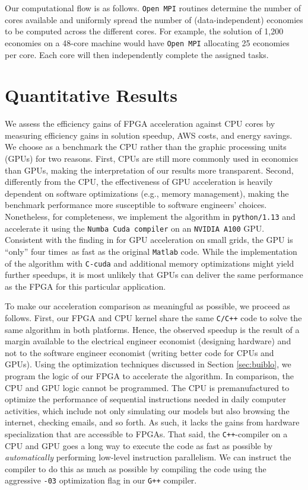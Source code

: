 \documentclass[12pt,american]{article}
\makeatletter
\newcommand{\numbeconII}{1,200\@\xspace}
\newcommand{\speedGPUvsMatlab}{four times}
\makeatother
\begin{document}
Our computational flow is as follows. \texttt{Open MPI} routines determine the number of cores available and uniformly spread the number of (data-independent) economies to be computed across the different cores. For example, the solution of \numbeconII economies on a 48-core machine would have \texttt{Open MPI} allocating 25 economies per core. Each core will then independently complete the assigned tasks. 

\section{Quantitative Results}\label{sec:quantitative}

We assess the efficiency gains of FPGA acceleration against CPU cores by measuring efficiency gains in solution speedup, AWS costs, and energy savings. We choose as a benchmark the CPU rather than the graphic processing units (GPUs) for two reasons. First, CPUs are still more commonly used in economics than GPUs, making the interpretation of our results more transparent. Second, differently from the CPU, the effectiveness of GPU acceleration is heavily dependent on software optimizations (e.g., memory management), making the benchmark performance more susceptible to software engineers' choices. Nonetheless, for completeness, we implement the \cite{MaliarMaliarValli2010} algorithm in \texttt{python/1.13} and accelerate it using the \texttt{Numba Cuda compiler} on an \texttt{NVIDIA A100} GPU. Consistent with the finding in \cite{Aldrich2011} for GPU acceleration on small grids, the GPU is ``only'' \speedGPUvsMatlab\ as fast as the original \texttt{Matlab} code. While the implementation of the algorithm with \texttt{C-cuda} and additional memory optimizations might yield further speedups, it is most unlikely that GPUs can deliver the same performance as the FPGA for this particular application.

To make our acceleration comparison as meaningful as possible, we proceed as follows. First, our FPGA and CPU kernel share the same \texttt{C/C++} code to solve the same algorithm in both platforms. Hence, the observed speedup is the result of a margin available to the electrical engineer economist (designing hardware) and not to the software engineer economist (writing better code for CPUs and GPUs). 
Using the optimization techniques discussed in Section \ref{sec:buiblo}, we program the logic of our FPGA to accelerate the \cite{KrusellSmith1998} algorithm. In comparison, the CPU and GPU logic cannot be programmed. The CPU is premanufactured to optimize the performance of sequential instructions needed in daily computer activities, which include not only simulating our models but also browsing the internet, checking emails, and so forth. As such, it lacks the gains from hardware specialization that are accessible to FPGAs. That said, the \texttt{C++}-compiler on a CPU and GPU goes a long way to execute the code as fast as possible by \textit{automatically} performing low-level instruction parallelism. We can instruct the compiler to do this as much as possible by compiling the code using the aggressive \texttt{-03} optimization flag in our \texttt{G++} compiler.
\end{document}
